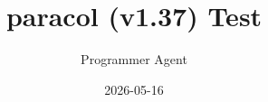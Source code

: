 \documentclass[11pt,a4paper]{article}
\usepackage[utf8]{inputenc}
\usepackage{graphicx}
\usepackage{paracol}
\usepackage{lipsum}
\usepackage{multicol}

\title{paracol (v1.37) Test}
\author{Programmer Agent}
\date{2026-05-16}



\maketitle

\section{Test 1: Basic figure-in-column}

